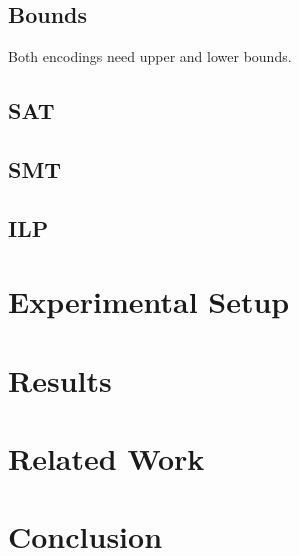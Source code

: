\documentclass{sig-alternate}
\begin{document}
\subsection{Bounds}

Both encodings need upper and lower bounds.

\subsection{SAT}

\subsection{SMT}

\subsection{ILP}

\section{Experimental Setup}

\section{Results}

\section{Related Work}

\cite{alves2013resource}
\cite{abio2014encoding}
\cite{wu2013exploiting}
\cite{velev2009exploiting}
\cite{horbach2010boolean}
\cite{klein1999computing}
\cite{mingozzi1998exact}
\cite{sharma2011polynomial}
\cite{ramani2004breaking}
\cite{schutt2011explaining}
\cite{wille2008using}
\cite{malaguti2010survey}
\cite{cs395tGCtoSAT}

\section{Conclusion}



\end{document}
